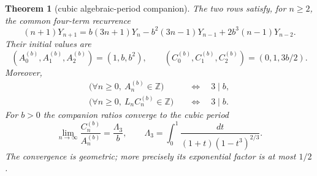 \documentclass[11pt]{article}
\newtheorem{theorem}{Theorem}
\theoremstyle{remark}
\newcommand{\Z}{\mathbb Z}
\begin{document}
\begin{theorem}[cubic algebraic-period companion]\label{thm:cubicperiod}
The two rows satisfy, for $n\ge2$, the common four-term recurrence
\begin{equation}\label{eq:cubicrec}
 (n+1)Y_{n+1}
 =b(3n+1)Y_n-b^2(3n-1)Y_{n-1}
   +2b^3(n-1)Y_{n-2}.
\end{equation}
Their initial values are
\[
 (A^{(b)}_0,A^{(b)}_1,A^{(b)}_2)=(1,b,b^2),
 \qquad
 (C^{(b)}_0,C^{(b)}_1,C^{(b)}_2)=(0,1,3b/2).
\]
Moreover,
\begin{align}
 \bigl(\forall n\ge0,\ A^{(b)}_n\in\Z\bigr)
   &\quad\Longleftrightarrow\quad 3\mid b,\label{eq:cubicAint}\\
 \bigl(\forall n\ge0,\ L_nC^{(b)}_n\in\Z\bigr)
   &\quad\Longleftrightarrow\quad 3\mid b.\label{eq:cubicCint}
\end{align}
For $b>0$ the companion ratios converge to the cubic period
\begin{equation}\label{eq:cubiclimit}
 \lim_{n\to\infty}\frac{C^{(b)}_n}{A^{(b)}_n}
 =\frac{\Lambda_3}{b},
 \qquad
 \Lambda_3=\int_0^1
 \frac{dt}{(1+t)(1-t^3)^{2/3}}.
\end{equation}
The convergence is geometric; more precisely its exponential factor is at
most $1/2$.
\end{theorem}
\end{document}
